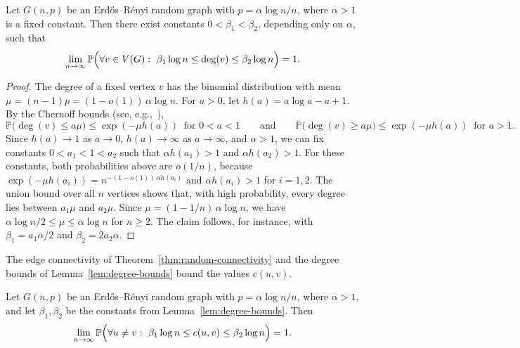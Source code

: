 \begin{lemma}
\label{lem:degree-bounds}
Let $G(n, p)$ be an Erdős–Rényi random graph with $p = \alpha \log n / n$, where $\alpha > 1$ is a fixed constant.
Then there exist constants $0 < \beta_1 < \beta_2$, depending only on $\alpha$, such that
\[
\lim_{n\to\infty} \mathbb{P}\Bigl( \forall v \in V(G): \ \beta_1 \log n \leq \deg(v) \leq \beta_2 \log n \Bigr) = 1.
\]
\end{lemma}

\begin{proof}
The degree of a fixed vertex $v$ has the binomial distribution with mean $\mu = (n-1)p = (1-o(1))\,\alpha \log n$.
For $a > 0$, let $h(a) = a \log a - a + 1$.
By the Chernoff bounds (see, e.g.,~\cite{Frieze2016}),
\[
\mathbb{P}\bigl(\deg(v) \leq a\mu\bigr) \leq \exp(-\mu h(a)) \ \text{ for } 0 < a < 1
\qquad\text{and}\qquad
\mathbb{P}\bigl(\deg(v) \geq a\mu\bigr) \leq \exp(-\mu h(a)) \ \text{ for } a > 1.
\]
Since $h(a) \to 1$ as $a \to 0$, $h(a) \to \infty$ as $a \to \infty$, and $\alpha > 1$, we can fix constants $0 < a_1 < 1 < a_2$ such that $\alpha h(a_1) > 1$ and $\alpha h(a_2) > 1$.
For these constants, both probabilities above are $o(1/n)$, because $\exp(-\mu h(a_i)) = n^{-(1-o(1))\,\alpha h(a_i)}$ and $\alpha h(a_i) > 1$ for $i = 1, 2$.
The union bound over all $n$ vertices shows that, with high probability, every degree lies between $a_1 \mu$ and $a_2 \mu$.
Since $\mu = (1 - 1/n)\,\alpha \log n$, we have $\alpha \log n / 2 \leq \mu \leq \alpha \log n$ for $n \geq 2$.
The claim follows, for instance, with $\beta_1 = a_1 \alpha / 2$ and $\beta_2 = 2 a_2 \alpha$.
\end{proof}

The edge connectivity of Theorem~\ref{thm:random-connectivity} and the degree bounds of Lemma~\ref{lem:degree-bounds} bound the values $c(u,v)$.

\begin{lemma}
\label{lem:connectivity-bounds}
Let $G(n, p)$ be an Erdős–Rényi random graph with $p = \alpha \log n / n$, where $\alpha > 1$, and let $\beta_1, \beta_2$ be the constants from Lemma~\ref{lem:degree-bounds}.
Then
\[
\lim_{n\to\infty} \mathbb{P}\Bigl( \forall u \neq v: \ \beta_1 \log n \leq c(u,v) \leq \beta_2 \log n \Bigr) = 1.
\]
\end{lemma}


